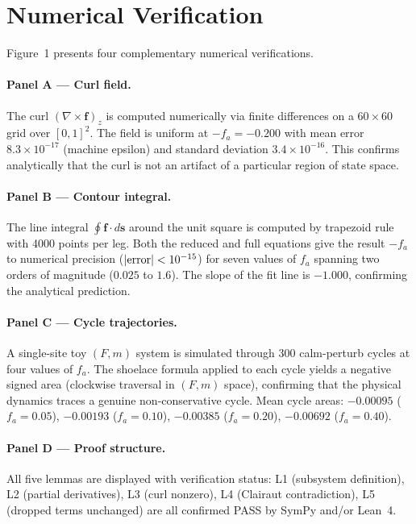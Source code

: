 \documentclass[11pt,a4paper]{article}
\begin{document}
\section{Numerical Verification}
\label{sec:numerical}

Figure~1 presents four complementary numerical verifications.

\paragraph{Panel A --- Curl field.}
The curl $(\nabla\times\mathbf{f})_z$ is computed numerically via finite
differences on a $60\times 60$ grid over $[0,1]^2$.
The field is uniform at $-f_a = -0.200$ with mean error $8.3\times 10^{-17}$
(machine epsilon) and standard deviation $3.4\times 10^{-16}$.
This confirms analytically that the curl is not an artifact of
a particular region of state space.

\paragraph{Panel B --- Contour integral.}
The line integral $\oint \mathbf{f}\cdot d\mathbf{s}$ around the unit square
is computed by trapezoid rule with 4000 points per leg.
Both the reduced and full equations give the result $-f_a$ to numerical
precision ($|{\rm error}| < 10^{-15}$) for seven values of $f_a$
spanning two orders of magnitude ($0.025$ to $1.6$).
The slope of the fit line is $-1.000$, confirming the analytical prediction.

\paragraph{Panel C --- Cycle trajectories.}
A single-site toy $(F, m)$ system is simulated through 300 calm-perturb
cycles at four values of $f_a$.
The shoelace formula applied to each cycle yields a negative signed area
(clockwise traversal in $(F,m)$ space), confirming that the physical dynamics
traces a genuine non-conservative cycle.
Mean cycle areas: $-0.00095$ ($f_a=0.05$), $-0.00193$ ($f_a=0.10$),
$-0.00385$ ($f_a=0.20$), $-0.00692$ ($f_a=0.40$).

\paragraph{Panel D --- Proof structure.}
All five lemmas are displayed with verification status:
L1 (subsystem definition), L2 (partial derivatives), L3 (curl nonzero),
L4 (Clairaut contradiction), L5 (dropped terms unchanged)
are all confirmed PASS by SymPy and/or Lean~4.
\end{document}
